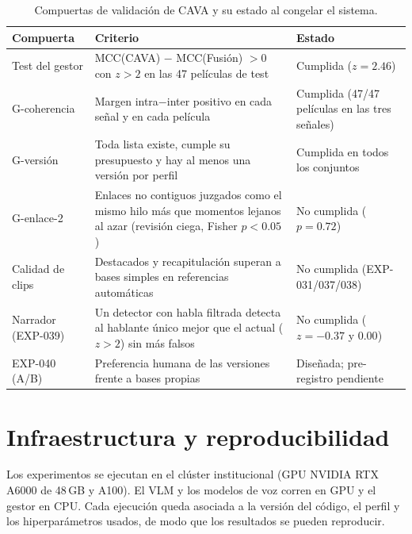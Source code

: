 \begin{table}[H]
    \centering
    \caption{Compuertas de validación de CAVA y su estado al congelar el sistema.}
    \label{tab:gates}
    \begin{tabular}{p{2.6cm}p{6.6cm}p{3.6cm}}
        \hline
        \textbf{Compuerta} & \textbf{Criterio} & \textbf{Estado} \\
        \hline
        Test del gestor & MCC(CAVA) $-$ MCC(Fusión) $> 0$ con
                      $z > 2$ en las 47 películas de test & Cumplida ($z = 2.46$) \\
        G-coherencia & Margen intra$-$inter positivo en cada señal y en cada película
                      & Cumplida (47/47 películas en las tres señales) \\
        G-versión & Toda lista existe, cumple su presupuesto y hay al menos una versión
                      por perfil & Cumplida en todos los conjuntos \\
        G-enlace-2 & Enlaces no contiguos juzgados como el mismo hilo más que momentos
                      lejanos al azar (revisión ciega, Fisher $p < 0.05$) & No cumplida
                      ($p = 0.72$) \\
        Calidad de clips & Destacados y recapitulación superan a bases simples en
                      referencias automáticas & No cumplida (EXP-031/037/038) \\
        Narrador (EXP-039) & Un detector con habla filtrada detecta al hablante único
                      mejor que el actual ($z > 2$) sin más falsos & No cumplida
                      ($z = -0.37$ y $0.00$) \\
        EXP-040 (A/B) & Preferencia humana de las versiones frente a bases propias &
                      Diseñada; pre-registro pendiente \\
        \hline
    \end{tabular}
\end{table}

\section{Infraestructura y reproducibilidad}

Los experimentos se ejecutan en el clúster institucional (GPU NVIDIA RTX A6000 de 48\,GB y
A100). El VLM y los modelos de voz corren en GPU y el gestor en CPU. Cada ejecución queda
asociada a la versión del código, el perfil y los hiperparámetros usados, de modo que los
resultados se pueden reproducir.

